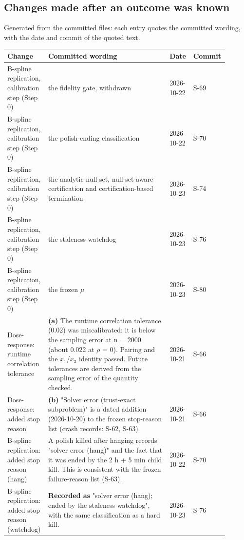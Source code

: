 \subsection*{Changes made after an outcome was known}
Generated from the committed files: each entry quotes the committed wording, with the date and commit of the quoted text.
{\footnotesize\setlength{\tabcolsep}{3pt}
\begin{longtable}{R{0.18\linewidth} R{0.54\linewidth} R{0.10\linewidth} R{0.08\linewidth}}
\toprule
Change & Committed wording & Date & Commit \\
\midrule
\endhead
B-spline replication, calibration step (Step 0) & the fidelity gate, withdrawn & 2026-10-22 & S-69 \\
B-spline replication, calibration step (Step 0) & the polish-ending classification & 2026-10-22 & S-70 \\
B-spline replication, calibration step (Step 0) & the analytic null set, null-set-aware certification and certification-based termination & 2026-10-23 & S-74 \\
B-spline replication, calibration step (Step 0) & the staleness watchdog & 2026-10-23 & S-76 \\
B-spline replication, calibration step (Step 0) & the frozen $\mu$ & 2026-10-23 & S-80 \\
Dose-response: runtime correlation tolerance & \textbf{(a)} The runtime correlation tolerance (0.02) was miscalibrated: it is below the sampling error at n = 2000 (about 0.022 at $\rho$ = 0). Pairing and the $x_{1}$/$x_{3}$ identity passed. Future tolerances are derived from the sampling error of the quantity checked. & 2026-10-21 & S-66 \\
Dose-response: added stop reason & \textbf{(b)} "Solver error (trust-exact subproblem)" is a dated addition (2026-10-20) to the frozen stop-reason list (crash records: S-62, S-63). & 2026-10-21 & S-66 \\
B-spline replication: added stop reason (hang) & A polish killed after hanging records "solver error (hang)" and the fact that it was ended by the 2 h + 5 min child kill. This is consistent with the frozen failure-reason list (S-63). & 2026-10-22 & S-70 \\
B-spline replication: added stop reason (watchdog) & \textbf{Recorded as} "solver error (hang); ended by the staleness watchdog", with the same classification as a hard kill. & 2026-10-23 & S-76 \\

\end{longtable}}
